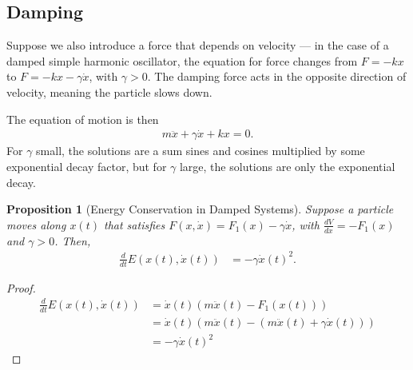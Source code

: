 \documentclass[10pt]{extarticle}
\theoremstyle{plain}
\newtheorem*{proposition}{Proposition}%
\theoremstyle{definition}
\theoremstyle{remark}
\renewcommand{\newline}{\hfill\break}
\begin{document}
  \subsection{Damping}%
  Suppose we also introduce a force that depends on velocity --- in the case of a damped simple harmonic oscillator, the equation for force changes from $F = -kx$ to $F = -kx - \gamma\dot{x}$, with $\gamma > 0$. The damping force acts in the opposite direction of velocity, meaning the particle slows down.\newline

  The equation of motion is then
  \begin{align*}
    m\ddot{x} + \gamma\dot{x} + kx = 0.
  \end{align*}
  For $\gamma$ small, the solutions are a sum sines and cosines multiplied by some exponential decay factor, but for $\gamma$ large, the solutions are only the exponential decay.\newline
  \begin{proposition}[Energy Conservation in Damped Systems]
    Suppose a particle moves along $x(t)$ that satisfies $F(x,\dot{x}) = F_1(x) - \gamma\dot{x}$, with $\frac{dV}{dx} = -F_1(x)$ and $\gamma > 0$. Then,
    \begin{align*}
      \frac{d}{dt}E(x(t),\dot{x}(t)) &= -\gamma\dot{x}(t)^2.
    \end{align*}
  \end{proposition}
  \begin{proof}
      \begin{align*}
        \frac{d}{dt}E(x(t),\dot{x}(t)) &= \dot{x}(t)\left(m\ddot{x}(t) - F_1(x(t))\right)\\
                                       &= \dot{x}(t)\left(m\ddot{x}(t) - (m\ddot{x}(t) + \gamma\dot{x}(t))\right)\\
                                       &= -\gamma\dot{x}(t)^2
      \end{align*}
  \end{proof}
\end{document}
